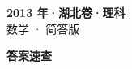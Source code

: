 \documentclass[zihao=-4, a4paper]{ctexart}
\begin{document}
\begin{center}
  {\Large\bfseries 2013 年·湖北卷·理科}\\[4pt]
  {\large 数学 · 简答版}
\end{center}
\medskip
{}

\clearpage
{}
\begin{center}{\Large\bfseries 答案速查}\end{center}
\medskip

\end{document}
